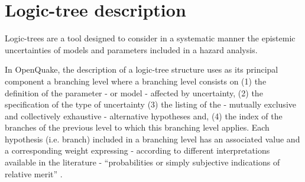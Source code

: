 \section{Logic-tree description}
\label{hazard:logic_tree}
Logic-trees are a tool designed to consider in a systematic manner the 
epistemic uncertainties of models and parameters included in a hazard 
analysis.

In OpenQuake, the description of a logic-tree structure uses as its principal 
component a branching level where a branching level consists on (1) the 
definition of the parameter - or model - affected by uncertainty, (2) the 
specification of the type of uncertainty (3) the listing of the - mutually 
exclusive and collectively exhaustive \citep{bommer2008} - alternative 
hypotheses and, (4) the index of the branches of the previous level to which 
this branching level applies. 
Each hypothesis (i.e. branch) included in a branching level has 
an associated value and a corresponding weight expressing - according to 
different interpretations available in the literature - ``probabilities or 
simply subjective indications of relative merit'' 
\citep[][pagecon 999]{bommer2008}.

